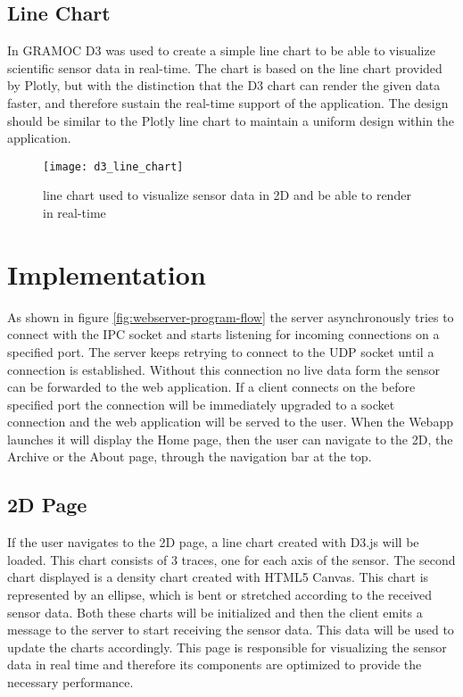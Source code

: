 \subsection{Line Chart}
In GRAMOC D3 was used to create a simple line chart to be able to visualize scientific sensor data in real-time. The chart is based on the line chart provided by Plotly, but with the distinction that the D3 chart can render the given data faster, and therefore sustain the real-time support of the application. The design should be similar to the Plotly line chart to maintain a uniform design within the application.

\begin{figure}[H]
    \centering
    \texttt{[image: d3\_line\_chart]}
    \caption{line chart used to visualize sensor data in 2D and be able to render in real-time}
    \label{fig:d3linechart}
\end{figure}


\section{Implementation}
As shown in figure \ref{fig:webserver-program-flow} the server asynchronously tries to connect with the IPC socket and starts listening for incoming connections on a specified port. The server keeps retrying to connect to the UDP socket until a connection is established. Without this connection no live data form the sensor can be forwarded to the web application. If a client connects on the before specified port the connection will be immediately upgraded to a socket connection and the web application will be served to the user. When the Webapp launches it will display the Home page, then the user can navigate to the 2D, the Archive or the About page, through the navigation bar at the top.

\subsection{2D Page}
If the user navigates to the 2D page, a line chart created with D3.js will be loaded. This chart consists of 3 traces, one for each axis of the sensor. The second chart displayed is a density chart created with HTML5 Canvas. This chart is represented by an ellipse, which is bent or stretched according to the received sensor data. Both these charts will be initialized and then the client emits a message to the server to start receiving the sensor data. This data will be used to update the charts accordingly. This page is responsible for visualizing the sensor data in real time and therefore its components are optimized to provide the necessary performance.

